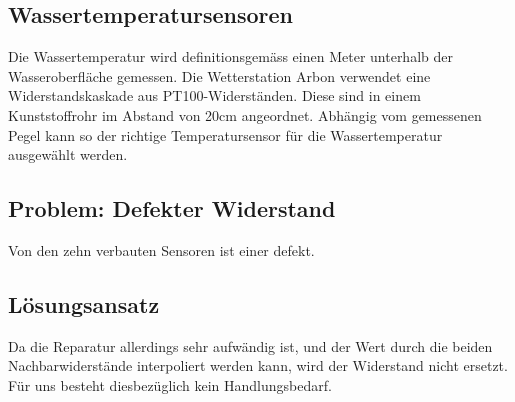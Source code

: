 \subsection{Wassertemperatursensoren}
Die Wassertemperatur wird definitionsgemäss einen Meter unterhalb der Wasseroberfläche gemessen. Die Wetterstation Arbon verwendet eine Widerstandskaskade aus PT100-Widerständen. Diese sind in einem Kunststoffrohr im Abstand von 20cm angeordnet. Abhängig vom gemessenen Pegel kann so der richtige Temperatursensor für die Wassertemperatur ausgewählt werden. 

\subsection*{Problem: Defekter Widerstand}
Von den zehn verbauten Sensoren ist einer defekt. 

\subsection*{Lösungsansatz}
Da die Reparatur allerdings sehr aufwändig ist, und der Wert durch die beiden Nachbarwiderstände interpoliert werden kann, wird der Widerstand nicht ersetzt. Für uns besteht diesbezüglich kein Handlungsbedarf.













